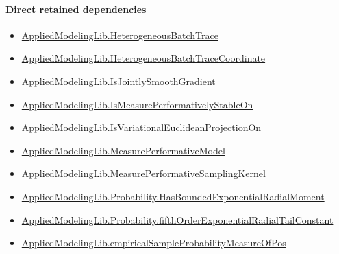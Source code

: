 \documentclass[10pt]{article}
\begin{document}
\paragraph{Direct retained dependencies}
\begin{itemize}\raggedright
\item \hyperlink{governing-declaration-307f711c4bf618c0}{Applied\allowbreak{}Modeling\allowbreak{}Lib.\allowbreak{}Heterogeneous\allowbreak{}Batch\allowbreak{}Trace}
\item \hyperlink{governing-declaration-37d7ae049de215a7}{Applied\allowbreak{}Modeling\allowbreak{}Lib.\allowbreak{}Heterogeneous\allowbreak{}Batch\allowbreak{}Trace\allowbreak{}Coordinate}
\item \hyperlink{library-prerequisite-2e05b739f5b71f23}{Applied\allowbreak{}Modeling\allowbreak{}Lib.\allowbreak{}Is\allowbreak{}Jointly\allowbreak{}Smooth\allowbreak{}Gradient}
\item \hyperlink{governing-declaration-522b06e211b1e40a}{Applied\allowbreak{}Modeling\allowbreak{}Lib.\allowbreak{}Is\allowbreak{}Measure\allowbreak{}Performatively\allowbreak{}Stable\allowbreak{}On}
\item \hyperlink{governing-declaration-41e49a877b22dbe7}{Applied\allowbreak{}Modeling\allowbreak{}Lib.\allowbreak{}Is\allowbreak{}Variational\allowbreak{}Euclidean\allowbreak{}Projection\allowbreak{}On}
\item \hyperlink{library-prerequisite-96553d4fbb82f1ac}{Applied\allowbreak{}Modeling\allowbreak{}Lib.\allowbreak{}Measure\allowbreak{}Performative\allowbreak{}Model}
\item \hyperlink{governing-declaration-527443e0fb077287}{Applied\allowbreak{}Modeling\allowbreak{}Lib.\allowbreak{}Measure\allowbreak{}Performative\allowbreak{}Sampling\allowbreak{}Kernel}
\item \hyperlink{governing-declaration-9604ed56aea35d91}{Applied\allowbreak{}Modeling\allowbreak{}Lib.\allowbreak{}Probability.\allowbreak{}Has\allowbreak{}Bounded\allowbreak{}Exponential\allowbreak{}Radial\allowbreak{}Moment}
\item \hyperlink{governing-declaration-93c495b865c4b878}{Applied\allowbreak{}Modeling\allowbreak{}Lib.\allowbreak{}Probability.\allowbreak{}fifth\allowbreak{}Order\allowbreak{}Exponential\allowbreak{}Radial\allowbreak{}Tail\allowbreak{}Constant}
\item \hyperlink{governing-declaration-cbd1f5f969456e5f}{Applied\allowbreak{}Modeling\allowbreak{}Lib.\allowbreak{}empirical\allowbreak{}Sample\allowbreak{}Probability\allowbreak{}Measure\allowbreak{}Of\allowbreak{}Pos}

\end{itemize}
\end{document}
